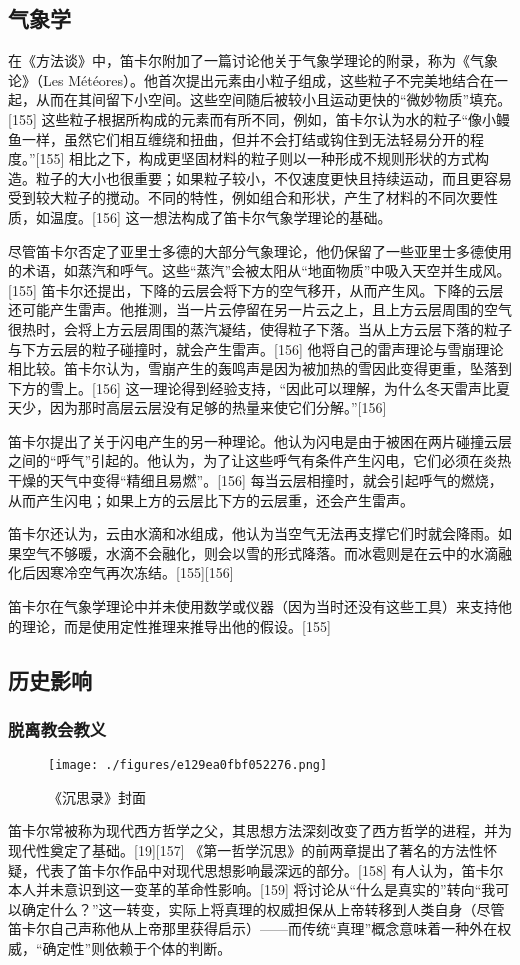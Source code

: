 \subsection{气象学}
在《方法谈》中，笛卡尔附加了一篇讨论他关于气象学理论的附录，称为《气象论》（Les Météores）。他首次提出元素由小粒子组成，这些粒子不完美地结合在一起，从而在其间留下小空间。这些空间随后被较小且运动更快的“微妙物质”填充。[155] 这些粒子根据所构成的元素而有所不同，例如，笛卡尔认为水的粒子“像小鳗鱼一样，虽然它们相互缠绕和扭曲，但并不会打结或钩住到无法轻易分开的程度。”[155] 相比之下，构成更坚固材料的粒子则以一种形成不规则形状的方式构造。粒子的大小也很重要；如果粒子较小，不仅速度更快且持续运动，而且更容易受到较大粒子的搅动。不同的特性，例如组合和形状，产生了材料的不同次要性质，如温度。[156] 这一想法构成了笛卡尔气象学理论的基础。

尽管笛卡尔否定了亚里士多德的大部分气象理论，他仍保留了一些亚里士多德使用的术语，如蒸汽和呼气。这些“蒸汽”会被太阳从“地面物质”中吸入天空并生成风。[155] 笛卡尔还提出，下降的云层会将下方的空气移开，从而产生风。下降的云层还可能产生雷声。他推测，当一片云停留在另一片云之上，且上方云层周围的空气很热时，会将上方云层周围的蒸汽凝结，使得粒子下落。当从上方云层下落的粒子与下方云层的粒子碰撞时，就会产生雷声。[156] 他将自己的雷声理论与雪崩理论相比较。笛卡尔认为，雪崩产生的轰鸣声是因为被加热的雪因此变得更重，坠落到下方的雪上。[156] 这一理论得到经验支持，“因此可以理解，为什么冬天雷声比夏天少，因为那时高层云层没有足够的热量来使它们分解。”[156]

笛卡尔提出了关于闪电产生的另一种理论。他认为闪电是由于被困在两片碰撞云层之间的“呼气”引起的。他认为，为了让这些呼气有条件产生闪电，它们必须在炎热干燥的天气中变得“精细且易燃”。[156] 每当云层相撞时，就会引起呼气的燃烧，从而产生闪电；如果上方的云层比下方的云层重，还会产生雷声。

笛卡尔还认为，云由水滴和冰组成，他认为当空气无法再支撑它们时就会降雨。如果空气不够暖，水滴不会融化，则会以雪的形式降落。而冰雹则是在云中的水滴融化后因寒冷空气再次冻结。[155][156]

笛卡尔在气象学理论中并未使用数学或仪器（因为当时还没有这些工具）来支持他的理论，而是使用定性推理来推导出他的假设。[155]
\subsection{历史影响}
\subsubsection{脱离教会教义}
\begin{figure}[ht]
\centering
\texttt{[image: ./figures/e129ea0fbf052276.png]}
\caption{《沉思录》封面} \label{fig_DKE_12}
\end{figure}
笛卡尔常被称为现代西方哲学之父，其思想方法深刻改变了西方哲学的进程，并为现代性奠定了基础。[19][157] 《第一哲学沉思》的前两章提出了著名的方法性怀疑，代表了笛卡尔作品中对现代思想影响最深远的部分。[158] 有人认为，笛卡尔本人并未意识到这一变革的革命性影响。[159] 将讨论从“什么是真实的”转向“我可以确定什么？”这一转变，实际上将真理的权威担保从上帝转移到人类自身（尽管笛卡尔自己声称他从上帝那里获得启示）——而传统“真理”概念意味着一种外在权威，“确定性”则依赖于个体的判断。

